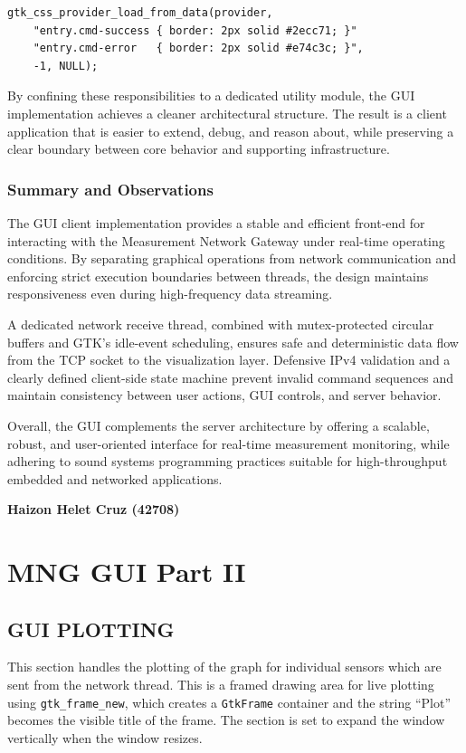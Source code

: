 \begin{verbatim}
gtk_css_provider_load_from_data(provider,
    "entry.cmd-success { border: 2px solid #2ecc71; }"
    "entry.cmd-error   { border: 2px solid #e74c3c; }",
    -1, NULL);
\end{verbatim}

By confining these responsibilities to a dedicated utility module, the GUI implementation achieves a cleaner architectural structure. The result is a client application that is easier to extend, debug, and reason about, while preserving a clear boundary between core behavior and supporting infrastructure.

\subsection{Summary and Observations}
The GUI client implementation provides a stable and efficient front-end for interacting with the Measurement Network Gateway under real-time operating conditions. By separating graphical operations from network communication and enforcing strict execution boundaries between threads, the design maintains responsiveness even during high-frequency data streaming.

A dedicated network receive thread, combined with mutex-protected circular buffers and GTK’s idle-event scheduling, ensures safe and deterministic data flow from the TCP socket to the visualization layer. Defensive IPv4 validation and a clearly defined client-side state machine prevent invalid command sequences and maintain consistency between user actions, GUI controls, and server behavior.

Overall, the GUI complements the server architecture by offering a scalable, robust, and user-oriented interface for real-time measurement monitoring, while adhering to sound systems programming practices suitable for high-throughput embedded and networked applications.




\clearpage 
\null 
\vfill 
\begin{center}
\textbf{\large Haizon Helet Cruz (42708)}
\end{center}
\vfill 
{}
\clearpage


\chapter{MNG GUI Part II}
\section{GUI PLOTTING}
This section handles the plotting of the graph for individual sensors which are sent from the network thread. This is a framed drawing area for live plotting using \texttt{gtk\_frame\_new}, which creates a \texttt{GtkFrame} container and the string ``Plot'' becomes the visible title of the frame. The section is set to expand the window vertically when the window resizes.


